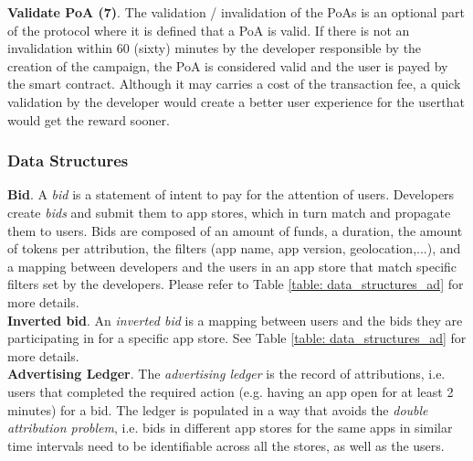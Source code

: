 \noindent \textbf{Validate \textsf{PoA} (7)}. The validation / invalidation of the \textsf{PoAs} is an optional part of the protocol where it is defined that a \textsf{PoA} is valid. If there is not an invalidation within 60 (sixty) minutes by the developer responsible by the creation of the campaign, the \textsf{PoA} is considered valid and the user is payed by the smart contract. Although it may carries a cost of the transaction fee, a quick validation by the developer would create a better user experience for the userthat would get the reward sooner. 

\subsubsection{Data Structures}
\label{sssec:ads_ds}

\noindent \textbf{Bid}. A \textit{bid} is a statement of intent to pay for the attention of users. Developers create \textit{bids} and submit them to app stores, which in turn match and propagate them to users. Bids are composed of an amount of funds, a duration, the amount of tokens per attribution, the filters (app name, app version, geolocation,...), and a mapping between developers and the users in an app store that match specific filters set by the developers. Please refer to Table \ref{table: data_structures_ad} for more details. \\

\noindent \textbf{Inverted bid}. An \textit{inverted bid} is a mapping between users and the bids they are participating in for a specific app store. See Table \ref{table: data_structures_ad} for more details.\\

\noindent \textbf{Advertising Ledger}. The \textit{advertising ledger} is the record of attributions, i.e. users that completed the required action (e.g. having an app open for at least 2 minutes) for a bid. The ledger is populated in a way that avoids the \textit{double attribution problem}, i.e. bids in different app stores for the same apps in similar time intervals need to be identifiable across all the stores, as well as the users.

